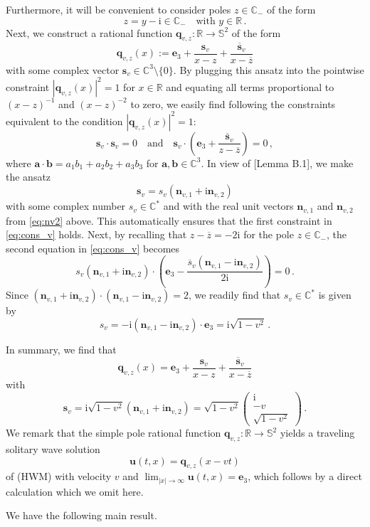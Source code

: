 \documentclass[11pt,reqno]{amsart}
\theoremstyle{definition}
\theoremstyle{remark}
\theoremstyle{remark}
\numberwithin{equation}{section}
\newcommand{\C}{\mathbb{C}}
\newcommand{\R}{\mathbb{R}}
\newcommand{\Ss}{\mathbb{S}}
\newcommand{\ov}{\overline}
\newcommand{\sv}{\mathbf{s}}
\newcommand{\nv}{\mathbf{n}}
\newcommand{\qv}{\mathbf{q}}
\newcommand{\be}{\begin{equation}}
\newcommand{\ee}{\end{equation}}
\newcommand{\ii}{\mathrm{i}}
\newcommand{\uu}{\mathbf{u}}
\begin{document}
\begin{appendix}
Furthermore, it will be convenient to consider poles $z \in \C_-$ of the form
\be \label{eq:pole}
z = y - \ii \in \C_- \quad \mbox{with $y \in \R$} \, .
\ee
Next, we construct a rational function $\qv_{v,z} : \R \to \Ss^2$ of the form
$$
\qv_{v,z}(x) := \mathbf{e}_3 +  \frac{\sv_{v}}{x-z} + \frac{\ov{\sv}_{v}}{x-\ov{z}} 
$$
with some complex vector $\sv_v \in \C^3 \setminus \{ 0 \}$. By plugging this ansatz into the pointwise constraint $|\qv_{v,z}(x)|^2 = 1$ for $x \in \R$ and equating all terms proportional to $(x-z)^{-1}$ and $(x-z)^{-2}$ to zero, we easily find following the constraints equivalent to the condition $|\qv_{v,z}(x)|^2=1$:
\be \label{eq:cons_v}
\sv_v \cdot \sv_v = 0 \quad \mbox{and} \quad \sv_v \cdot \left ( \mathbf{e}_3 + \frac{\ov{\sv}_v}{z - \ov{z}} \right ) = 0 \, ,
\ee
where $\mathbf{a} \cdot \mathbf{b} = a_1 b_1 + a_2 b_2 + a_3 b_3$ for $\mathbf{a}, \mathbf{b} \in \C^3$.  In view of \cite{BeKlLa-20}[Lemma B.1], we make the ansatz 
$$
\sv_v = s_{v} ( \nv_{v,1} + \ii \nv_{v,2} )
$$
with some complex number $s_{v} \in \C^*$ and with the real unit vectors $\nv_{v,1}$ and $\nv_{v,2}$ from \eqref{eq:nv2} above. This automatically ensures that the first constraint in \eqref{eq:cons_v} holds. Next, by recalling that $z-\ov{z} = -2 \ii$ for the pole $z \in \C_-$, the second equation in \eqref{eq:cons_v} becomes
$$
s_v ( \nv_{v,1} + \ii \nv_{v,2}) \cdot \left ( \mathbf{e}_3 - \frac{\ov{s}_v(\nv_{v,1} -\ii \nv_{v,2})}{2 \ii} \right ) = 0 \, .
$$
Since $(\nv_{v,1}+\ii \nv_{v,2})\cdot(\nv_{v,1}-\ii \nv_{v,2}) = 2$, we readily find that $s_v \in \C^*$ is given by
\be \label{eq:sv_nice}
s_v = -\ii ( \nv_{v,1} -\ii \nv_{v,2}) \cdot \mathbf{e}_3 =  \ii \sqrt{1-v^2} \, .
\ee

In summary, we find that 
$$
\qv_{v,z}(x) = \mathbf{e}_3 + \frac{\sv_v}{x-z} + \frac{\ov{\sv}_v}{x-\ov{z}} 
$$
with
\be  \label{eq:sv}
\sv_v =  \ii \sqrt{1-v^2} ( \nv_{v,1} + \ii \nv_{v,2} ) =  \sqrt{1-v^2}  \left ( \begin{array}{c} \ii  \\ -v  \\  \sqrt{1-v^2} \end{array} \right )  \, .
\ee 
We remark that the simple pole rational function $\qv_{v,z} : \R \to \Ss^2$ yields a traveling solitary wave solution
$$
\uu(t,x) = \qv_{v,z}(x-vt)
$$
of (HWM) with velocity $v$ and $\lim_{|x| \to \infty} \uu(t,x) = \mathbf{e}_3$, which follows by a direct calculation which we omit here.

 
 

We have the following main result.


\end{appendix}
\end{document}
